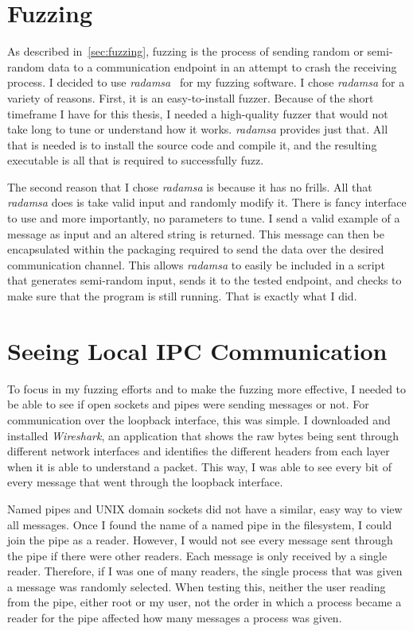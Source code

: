 \section{Fuzzing}
\label{sec:fuzzingMethods}
As described in~\ref{sec:fuzzing}, fuzzing is the process of sending random or semi-random data to a communication endpoint in an attempt to crash the receiving process.  I decided to use \textit{radamsa}~\cite{radamsa} for my fuzzing software.  I chose \textit{radamsa} for a variety of reasons.  First, it is an easy-to-install fuzzer.  Because of the short timeframe I have for this thesis, I needed a high-quality fuzzer that would not take long to tune or understand how it works.  \textit{radamsa} provides just that.  All that is needed is to install the source code and compile it, and the resulting executable is all that is required to successfully fuzz.

The second reason that I chose \textit{radamsa} is because it has no frills.  All that \textit{radamsa} does is take valid input and randomly modify it.  There is fancy interface to use and more importantly, no parameters to tune.  I send a valid example of a message as input and an altered string is returned.  This message can then be encapsulated within the packaging required to send the data over the desired communication channel.  This allows \textit{radamsa} to easily be included in a script that generates semi-random input, sends it to the tested endpoint, and checks to make sure that the program is still running.  That is exactly what I did.

\section{Seeing Local IPC Communication}
\label{sec:seeingLocalIPC}
To focus in my fuzzing efforts and to make the fuzzing more effective, I needed to be able to see if open sockets and pipes were sending messages or not.  For communication over the loopback interface, this was simple.  I downloaded and installed \textit{Wireshark}, an application that shows the raw bytes being sent through different network interfaces and identifies the different headers from each layer when it is able to understand a packet.  This way, I was able to see every bit of every message that went through the loopback interface.

Named pipes and UNIX domain sockets did not have a similar, easy way to view all messages.  Once I found the name of a named pipe in the filesystem, I could join the pipe as a reader.  However, I would not see every message sent through the pipe if there were other readers.  Each message is only received by a single reader.  Therefore, if I was one of many readers, the single process that was given a message was randomly selected.  When testing this, neither the user reading from the pipe, either root or my user, not the order in which a process became a reader for the pipe affected how many messages a process was given.

